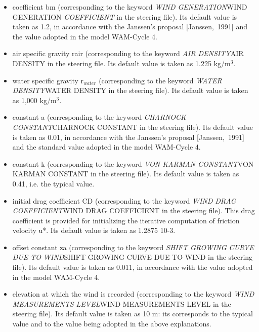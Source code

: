 \begin{itemize}
\item  coefficient bm (corresponding to the keyword \textit{WIND GENERATION}WIND GENERATION\textit{ COEFFICIENT }in the steering file). Its default value is taken as 1.2, in accordance with the Janssen's proposal [Janssen,~1991] and the value adopted in the model WAM-Cycle 4.

\item  air specific gravity rair (corresponding to the keyword \textit{AIR DENSITY}AIR DENSITY\textit{ }in the steering file. Its default value is taken as 1.225 kg/m${}^{3}$.

\item  water specific gravity r${}_{water}$ (corresponding to the keyword \textit{WATER DENSITY}WATER DENSITY\textit{ }in the steering file). Its default value is taken as 1,000 kg/m${}^{3}$.

\item  constant a (corresponding to the keyword \textit{CHARNOCK CONSTANT}CHARNOCK CONSTANT\textit{ }in the steering file). Its default value is taken as 0.01, in accordance with the Janssen's proposal [Janssen,~1991] and the standard value adopted in the model WAM-Cycle 4.

\item  constant k (corresponding to the keyword \textit{VON KARMAN CONSTANT}VON KARMAN CONSTANT\textit{ }in the steering file). Its default value is taken as 0.41, i.e. the typical value.

\item  initial drag coefficient CD (corresponding to the keyword \textit{WIND DRAG COEFFICIENT}WIND DRAG COEFFICIENT\textit{ }in the steering file). This drag coefficient is provided for initializing the iterative computation of friction velocity u*. Its default value is taken as 1.2875 10-3.

\item  offset constant za (corresponding to the keyword \textit{SHIFT GROWING CURVE DUE TO WIND}SHIFT GROWING CURVE DUE TO WIND\textit{ }in the steering file). Its default value is taken as 0.011, in accordance with the value adopted in the model WAM-Cycle 4.

\item  elevation at which the wind is recorded (corresponding to the keyword \textit{WIND MEASUREMENTS LEVEL}WIND MEASUREMENTS LEVEL\textit{ }in the steering file). Its default value is taken as 10 m: its corresponds to the typical value and to the value being adopted in the above explanations.
\end{itemize}


